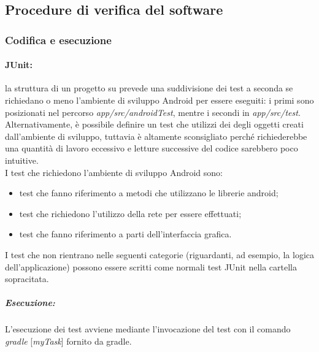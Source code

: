 \subsection{Procedure di verifica del software}
\subsubsection{Codifica e esecuzione}
\paragraph{JUnit:}
la struttura di un progetto su 	 prevede una suddivisione dei test a seconda se richiedano o meno l'ambiente di sviluppo Android per essere eseguiti: i primi sono posizionati nel percorso \textit{app/src/androidTest}, mentre i secondi in \textit{app/src/test}.\\
Alternativamente, è possibile definire un test che utilizzi dei  degli oggetti creati dall'ambiente di sviluppo, tuttavia è altamente sconsigliato perché richiederebbe una quantità di lavoro eccessivo e letture successive del codice sarebbero poco intuitive.\\
I test che richiedono l'ambiente di sviluppo Android sono:
\begin{itemize}
	\item test che fanno riferimento a metodi che utilizzano le librerie android; 
	\item test che richiedono l'utilizzo della rete per essere effettuati; 
	\item test che fanno riferimento a parti dell'interfaccia grafica.
\end{itemize}
I test che non rientrano nelle seguenti categorie (riguardanti, ad esempio, la logica dell'applicazione) possono essere scritti come normali test JUnit nella cartella sopracitata.
\subparagraph{Esecuzione:} L'esecuzione dei test avviene mediante l'invocazione del test con il comando \textit{gradle} [\textit{myTask}] fornito da gradle. 

